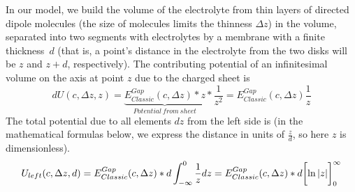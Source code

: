 \fi


\ifx\magyar\undefined

In our model, we build the volume of the electrolyte
from thin layers of directed dipole molecules (the size of molecules limits the thinness $\Delta z$) in the volume, separated into two segments with electrolytes by a membrane with
a finite thickness~$d$ (that is, a point's distance in the electrolyte from the 
two disks will be $z$ and $z+d$, respectively). 
The contributing potential of an infinitesimal volume on the axis at point $z$ due to the charged sheet is
\[
dU(c,\Delta z,z) = 
\underbrace{E^{Gap}_{Classic}(c,\Delta z)*z}_{Potential~ from~sheet}*\frac{1}{z^2}
=  
E^{Gap}_{Classic}(c,\Delta z)\frac{1}{z}
\]
The total potential due to all elements $dz$ from the left side is (in the mathematical formulas below, we express the distance in units of $\frac{z}{d}$, so here $z$ is dimensionless).
\begin{equation}
	U_{left}(c,\Delta z,d)=E^{Gap}_{Classic}(c,\Delta z)*d\int_{-\infty}^0\frac{1}{z} dz =\\ E^{Gap}_{Classic}(c,\Delta z)*d \biggl[\ln | z | \biggr]_{0}^{\infty}\label{eq:Physics-InternalPotentialL}
\end{equation}

